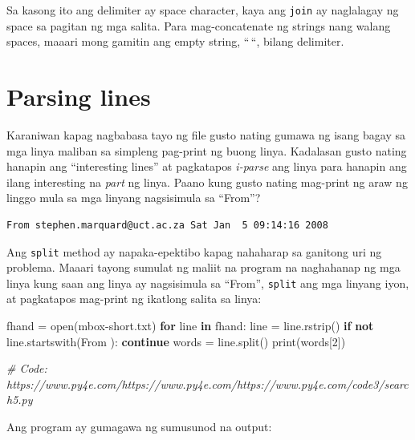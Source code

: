 \documentclass[10pt,]{book}
\newenvironment{Shaded}{}{}
\newcommand{\BuiltInTok}[1]{\textcolor[rgb]{0.00,0.50,0.00}{#1}}
\newcommand{\CommentTok}[1]{\textcolor[rgb]{0.38,0.63,0.69}{\textit{#1}}}
\newcommand{\ControlFlowTok}[1]{\textcolor[rgb]{0.00,0.44,0.13}{\textbf{#1}}}
\newcommand{\DecValTok}[1]{\textcolor[rgb]{0.25,0.63,0.44}{#1}}
\newcommand{\KeywordTok}[1]{\textcolor[rgb]{0.00,0.44,0.13}{\textbf{#1}}}
\newcommand{\NormalTok}[1]{#1}
\newcommand{\OperatorTok}[1]{\textcolor[rgb]{0.40,0.40,0.40}{#1}}
\newcommand{\StringTok}[1]{\textcolor[rgb]{0.25,0.44,0.63}{#1}}
\begin{document}
Sa kasong ito ang delimiter ay space character, kaya ang \texttt{join}
ay naglalagay ng space sa pagitan ng mga salita. Para mag-concatenate ng
strings nang walang spaces, maaari mong gamitin ang empty string,
``\,``, bilang delimiter.

 

\section{Parsing lines}\label{parsing-lines}

Karaniwan kapag nagbabasa tayo ng file gusto nating gumawa ng isang
bagay sa mga linya maliban sa simpleng pag-print ng buong linya.
Kadalasan gusto nating hanapin ang ``interesting lines'' at pagkatapos
\emph{i-parse} ang linya para hanapin ang ilang interesting na
\emph{part} ng linya. Paano kung gusto nating mag-print ng araw ng
linggo mula sa mga linyang nagsisimula sa ``From''?

{\small
\begin{verbatim}
From stephen.marquard@uct.ac.za Sat Jan  5 09:14:16 2008
\end{verbatim}
}

Ang \texttt{split} method ay napaka-epektibo kapag nahaharap sa ganitong
uri ng problema. Maaari tayong sumulat ng maliit na program na
naghahanap ng mga linya kung saan ang linya ay nagsisimula sa ``From'',
\texttt{split} ang mga linyang iyon, at pagkatapos mag-print ng ikatlong
salita sa linya:

\begin{Shaded}
\begin{Highlighting}[]
\NormalTok{fhand }\OperatorTok{=} \BuiltInTok{open}\NormalTok{(}\StringTok{\textquotesingle{}mbox{-}short.txt\textquotesingle{}}\NormalTok{)}
\ControlFlowTok{for}\NormalTok{ line }\KeywordTok{in}\NormalTok{ fhand:}
\NormalTok{    line }\OperatorTok{=}\NormalTok{ line.rstrip()}
    \ControlFlowTok{if} \KeywordTok{not}\NormalTok{ line.startswith(}\StringTok{\textquotesingle{}From \textquotesingle{}}\NormalTok{): }\ControlFlowTok{continue}
\NormalTok{    words }\OperatorTok{=}\NormalTok{ line.split()}
    \BuiltInTok{print}\NormalTok{(words[}\DecValTok{2}\NormalTok{])}

\CommentTok{\# Code: https://www.py4e.com/https://www.py4e.com/https://www.py4e.com/code3/search5.py}
\end{Highlighting}
\end{Shaded}


Ang program ay gumagawa ng sumusunod na output:
\end{document}
